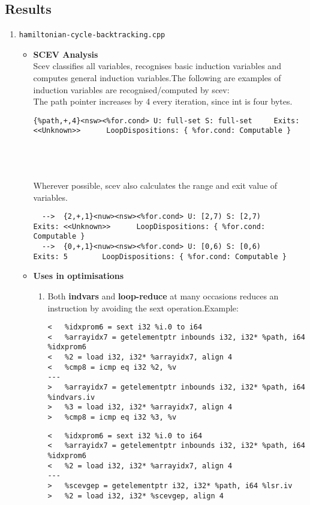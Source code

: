 \documentclass[12pt]{article}
\begin{document}
\subsection*{Results}
\begin{enumerate}
\item \texttt{hamiltonian-cycle-backtracking.cpp}
\begin{itemize}
\item \textbf{SCEV Analysis}\\
Scev classifies all variables, recognises basic induction variables and computes general induction variables.The following are examples of induction variables are recognised/computed by scev:\\

The path pointer increases by 4 every iteration, since int is four bytes. 
\begin{lstlisting}
{%path,+,4}<nsw><%for.cond> U: full-set S: full-set		Exits: <<Unknown>>		LoopDispositions: { %for.cond: Computable }
\end{lstlisting}~\\\\\\
Wherever possible, scev also calculates the range and exit value of variables.\\
\begin{lstlisting}
  -->  {2,+,1}<nuw><nsw><%for.cond> U: [2,7) S: [2,7)		Exits: <<Unknown>>		LoopDispositions: { %for.cond: Computable }
  -->  {0,+,1}<nuw><nsw><%for.cond> U: [0,6) S: [0,6)		Exits: 5		LoopDispositions: { %for.cond: Computable }
\end{lstlisting}
\item \textbf{Uses in optimisations}
\begin{enumerate}
\item Both \textbf{indvars} and \textbf{loop-reduce} at many occasions reduces an instruction by avoiding the sext operation.Example:\\
\begin{lstlisting}
<   %idxprom6 = sext i32 %i.0 to i64
<   %arrayidx7 = getelementptr inbounds i32, i32* %path, i64 %idxprom6
<   %2 = load i32, i32* %arrayidx7, align 4
<   %cmp8 = icmp eq i32 %2, %v
---
>   %arrayidx7 = getelementptr inbounds i32, i32* %path, i64 %indvars.iv
>   %3 = load i32, i32* %arrayidx7, align 4
>   %cmp8 = icmp eq i32 %3, %v

\end{lstlisting}
\begin{lstlisting}
<   %idxprom6 = sext i32 %i.0 to i64
<   %arrayidx7 = getelementptr inbounds i32, i32* %path, i64 %idxprom6
<   %2 = load i32, i32* %arrayidx7, align 4
---
>   %scevgep = getelementptr i32, i32* %path, i64 %lsr.iv
>   %2 = load i32, i32* %scevgep, align 4


\end{lstlisting}
\end{enumerate}
\end{itemize}
\end{enumerate}
\end{document}

